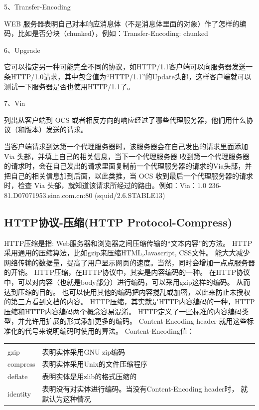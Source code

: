 \documentclass{book}
\begin{document}
5、Transfer-Encoding

WEB 服务器表明自己对本响应消息体（不是消息体里面的对象）作了怎样的编码，比如是否分块（chunked），例如：Transfer-Encoding: chunked

6、Upgrade

它可以指定另一种可能完全不同的协议，如HTTP/1.1客户端可以向服务器发送一条HTTP/1.0请求，其中包含值为“HTTP/1.1”的Update头部，这样客户端就可以测试一下服务器是否也使用HTTP/1.1了。

7、Via

列出从客户端到 OCS 或者相反方向的响应经过了哪些代理服务器，他们用什么协议（和版本）发送的请求。

当客户端请求到达第一个代理服务器时，该服务器会在自己发出的请求里面添加 Via 头部，并填上自己的相关信息，当下一个代理服务器 收到第一个代理服务器的请求时，会在自己发出的请求里面复制前一个代理服务器的请求的Via头部，并把自己的相关信息加到后面，以此类推，当 OCS 收到最后一个代理服务器的请求时，检查 Via 头部，就知道该请求所经过的路由。例如：Via：1.0 236-81.D07071953.sina.com.cn:80 (squid/2.6.STABLE13)

\subsection{HTTP协议-压缩(HTTP Protocol-Compress)}

HTTP压缩是指: Web服务器和浏览器之间压缩传输的“文本内容”的方法。
HTTP采用通用的压缩算法，比如gzip来压缩HTML,Javascript, CSS文件。
能大大减少网络传输的数据量，提高了用户显示网页的速度。当然，同时会增加一点点服务器的开销。
HTTP压缩，在HTTP协议中，其实是内容编码的一种。
在HTTP协议中，可以对内容（也就是body部分）进行编码，可以采用gzip这样的编码。
从而达到压缩的目的。 也可以使用其他的编码把内容搅乱或加密，以此来防止未授权的第三方看到文档的内容。
HTTP压缩，其实就是HTTP内容编码的一种，HTTP压缩和HTTP内容编码两个概念容易混淆。
HTTP定义了一些标准的内容编码类型，并允许用扩展的形式添加更多的编码。
Content-Encoding header 就用这些标准化的代号来说明编码时使用的算法。
Content-Encoding值：

\begin{tabular}{l|p{12cm}}
	\multirow{1}{*}{}			
	& \multicolumn{1}{c}{}\\
	gzip & 表明实体采用GNU zip编码\\
	compress & 表明实体采用Unix的文件压缩程序\\
	deflate & 表明实体是用zlib的格式压缩的\\
	identity & 表明没有对实体进行编码。当没有Content-Encoding header时， 就默认为这种情况\\
\end{tabular}
\end{document}
